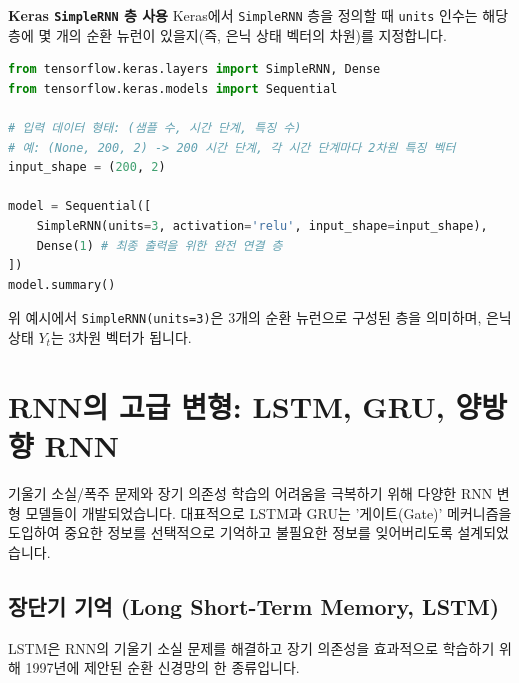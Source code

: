 \documentclass[11pt,a4paper]{book}
\theoremstyle{definition}
\begin{document}
\begin{enumerate}
    \begin{tipbox}
    \textbf{Keras \texttt{SimpleRNN} 층 사용}
    Keras에서 \texttt{SimpleRNN} 층을 정의할 때 \texttt{units} 인수는 해당 층에 몇 개의 순환 뉴런이 있을지(즉, 은닉 상태 벡터의 차원)를 지정합니다.
    \begin{lstlisting}[language=Python, caption=Keras SimpleRNN 층 정의 예시, label=lst:simplernn_layer]
from tensorflow.keras.layers import SimpleRNN, Dense
from tensorflow.keras.models import Sequential

# 입력 데이터 형태: (샘플 수, 시간 단계, 특징 수)
# 예: (None, 200, 2) -> 200 시간 단계, 각 시간 단계마다 2차원 특징 벡터
input_shape = (200, 2) 

model = Sequential([
    SimpleRNN(units=3, activation='relu', input_shape=input_shape),
    Dense(1) # 최종 출력을 위한 완전 연결 층
])
model.summary()
    \end{lstlisting}
    위 예시에서 \texttt{SimpleRNN(units=3)}은 3개의 순환 뉴런으로 구성된 층을 의미하며, 은닉 상태 $Y_t$는 3차원 벡터가 됩니다.
    \end{tipbox}
\end{enumerate}


\section{RNN의 고급 변형: LSTM, GRU, 양방향 RNN}
기울기 소실/폭주 문제와 장기 의존성 학습의 어려움을 극복하기 위해 다양한 RNN 변형 모델들이 개발되었습니다. 대표적으로 LSTM과 GRU는 '게이트(Gate)' 메커니즘을 도입하여 중요한 정보를 선택적으로 기억하고 불필요한 정보를 잊어버리도록 설계되었습니다.

\subsection{장단기 기억 (Long Short-Term Memory, LSTM)}
LSTM은 RNN의 기울기 소실 문제를 해결하고 장기 의존성을 효과적으로 학습하기 위해 1997년에 제안된 순환 신경망의 한 종류입니다.
\end{document}
